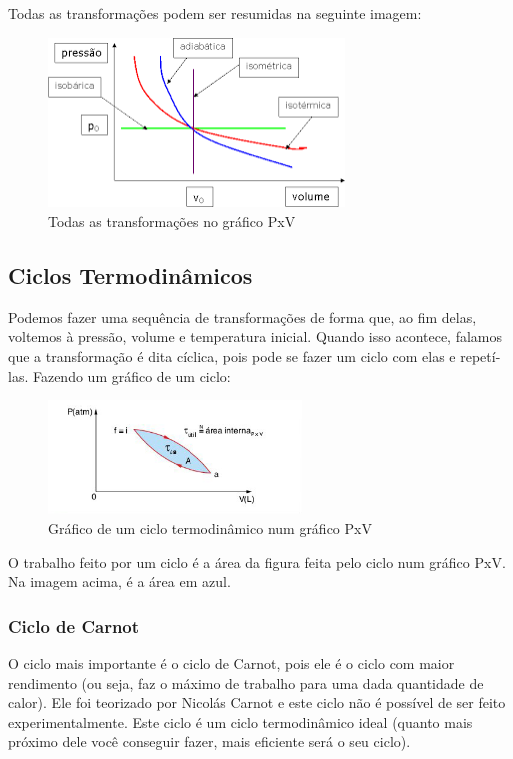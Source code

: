 \documentclass[12pt]{extarticle}
\newcommand{\<}{\langle}
\renewcommand{\>}{\rangle}
\theoremstyle{definition}
\begin{document}
Todas as transformações podem ser resumidas na seguinte imagem:
\begin{figure}[H]
    \centering
    \includegraphics[width=0.7\textwidth]{todas_as_transformacoes.png}
    \caption{Todas as transformações no gráfico PxV}
    \label{fig:pv_transforms}
\end{figure}

\subsection{Ciclos Termodinâmicos}

Podemos fazer uma sequência de transformações de forma que, ao fim delas, voltemos à pressão, volume e temperatura inicial. Quando isso acontece, falamos que a transformação é dita cíclica, pois pode se fazer um ciclo com elas e repetí-las. Fazendo um gráfico de um ciclo:

\begin{figure}[h]
    \centering
    \includegraphics[width=0.6\textwidth]{ciclos_pv.png}
    \caption{Gráfico de um ciclo termodinâmico num gráfico PxV}
    \label{fig:cycle}
\end{figure}

O trabalho feito por um ciclo é a área da figura feita pelo ciclo num gráfico PxV. Na imagem acima, é a área em azul.

\subsubsection{Ciclo de Carnot}
O ciclo mais importante é o ciclo de Carnot, pois ele é o ciclo com maior rendimento (ou seja, faz o máximo de trabalho para uma dada quantidade de calor). Ele foi teorizado por Nicolás Carnot e este ciclo não é possível de ser feito experimentalmente. Este ciclo é um ciclo termodinâmico ideal (quanto mais próximo dele você conseguir fazer, mais eficiente será o seu ciclo).
\end{document}
